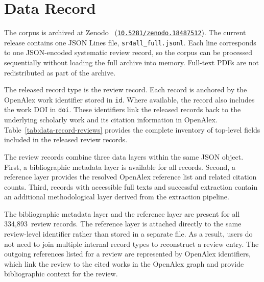 \section*{Data Record}

The \webisSRCorpus{} corpus is archived at Zenodo~\cite{achkar:2026sr4all} (\href{https://doi.org/10.5281/zenodo.18487512}{\texttt{10.5281/zenodo.18487512}}). The current release contains one JSON Lines file, \texttt{sr4all\_full.jsonl}. Each line corresponds to one JSON-encoded systematic review record, so the corpus can be processed sequentially without loading the full archive into memory. Full-text PDFs are not redistributed as part of the archive.

The released record type is the review record. Each record is anchored by the OpenAlex work identifier stored in \texttt{id}. Where available, the record also includes the work DOI in \texttt{doi}. These identifiers link the released records back to the underlying scholarly work and its citation information in OpenAlex. Table~\ref{tab:data-record-reviews} provides the complete inventory of top-level fields included in the released review records.

The review records combine three data layers within the same JSON object. First, a bibliographic metadata layer is available for all records. Second, a reference layer provides the resolved OpenAlex reference list and related citation counts. Third, records with accessible full texts and successful extraction contain an additional methodological layer derived from the extraction pipeline.

The bibliographic metadata layer and the reference layer are present for all 334,893~review records. The reference layer is attached directly to the same review-level identifier rather than stored in a separate file. As a result, users do not need to join multiple internal record types to reconstruct a review entry. The outgoing references listed for a review are represented by OpenAlex identifiers, which link the review to the cited works in the OpenAlex graph and provide bibliographic context for the review.

